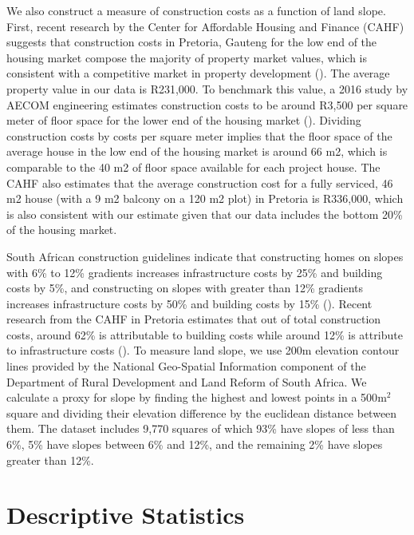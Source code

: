 \documentclass[12pt]{article}
\begin{document}
We also construct a measure of construction costs as a function of land slope.  First, recent research by the Center for Affordable Housing and Finance (CAHF) suggests that construction costs in Pretoria, Gauteng for the low end of the housing market compose the majority of property market values, which is consistent with a competitive market in property development (\cite{cahfcosts}).  The average property value in our data is R231,000.  To benchmark this value, a 2016 study by AECOM engineering estimates construction costs to be around R3,500 per square meter of floor space for the lower end of the housing market (\cite{aecom}).  Dividing construction costs by costs per square meter implies that the floor space of the average house in the low end of the housing market is around 66 m2, which is comparable to the 40 m2 of floor space available for each project house.  The CAHF also estimates that the average construction cost for a fully serviced, 46 m2 house (with a 9 m2 balcony on a 120 m2 plot) in Pretoria is R336,000, which is also consistent with our estimate given that our data includes the bottom 20\% of the housing market.

South African construction guidelines indicate that constructing homes on slopes with 6\% to 12\% gradients increases infrastructure costs by 25\% and building costs by 5\%, and constructing on slopes with greater than 12\% gradients increases infrastructure costs by 50\% and building costs by 15\% (\cite{redbook}).  Recent research from the CAHF in Pretoria estimates that out of total construction costs, around 62\% is attributable to building costs while around 12\% is attribute to infrastructure costs (\cite{cahfcosts}).  To measure land slope, we use 200m elevation contour lines provided by the National Geo-Spatial Information component of the Department of Rural Development and Land Reform of South Africa.  We calculate a proxy for slope by finding the highest and lowest points in a 500$\text{m}^{2}$ square and dividing their elevation difference by the euclidean distance between them.  The dataset includes 9,770 squares of which 93\% have slopes of less than 6\%, 5\% have slopes between 6\% and 12\%, and the remaining 2\% have slopes greater than 12\%.


\section{Descriptive Statistics}\label{section:descriptives}
\end{document}
